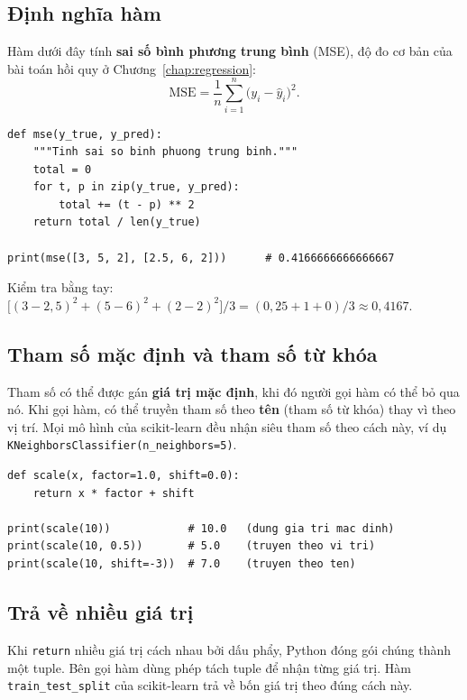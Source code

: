 \subsection{Định nghĩa hàm}
Hàm dưới đây tính \textbf{sai số bình phương trung bình} (MSE), độ đo cơ bản của bài toán hồi quy ở Chương~\ref{chap:regression}:
\begin{equation*}
    \mathrm{MSE} = \frac{1}{n}\sum_{i=1}^{n}\big(y_i - \hat{y}_i\big)^2 .
\end{equation*}

\begin{lstlisting}[caption={Định nghĩa hàm tính MSE}]
def mse(y_true, y_pred):
    """Tinh sai so binh phuong trung binh."""
    total = 0
    for t, p in zip(y_true, y_pred):
        total += (t - p) ** 2
    return total / len(y_true)

print(mse([3, 5, 2], [2.5, 6, 2]))      # 0.4166666666666667
\end{lstlisting}

\noindent Kiểm tra bằng tay: $\big[(3 - 2{,}5)^2 + (5 - 6)^2 + (2 - 2)^2\big] / 3 = (0{,}25 + 1 + 0)/3 \approx 0{,}4167$.

\subsection{Tham số mặc định và tham số từ khóa}
Tham số có thể được gán \textbf{giá trị mặc định}, khi đó người gọi hàm có thể bỏ qua nó. Khi gọi hàm, có thể truyền tham số theo \textbf{tên} (tham số từ khóa) thay vì theo vị trí. Mọi mô hình của scikit-learn đều nhận siêu tham số theo cách này, ví dụ \texttt{KNeighborsClassifier(n\_neighbors=5)}.

\begin{lstlisting}[caption={Tham số mặc định và tham số từ khóa}]
def scale(x, factor=1.0, shift=0.0):
    return x * factor + shift

print(scale(10))            # 10.0   (dung gia tri mac dinh)
print(scale(10, 0.5))       # 5.0    (truyen theo vi tri)
print(scale(10, shift=-3))  # 7.0    (truyen theo ten)
\end{lstlisting}

\subsection{Trả về nhiều giá trị}
Khi \texttt{return} nhiều giá trị cách nhau bởi dấu phẩy, Python đóng gói chúng thành một tuple. Bên gọi hàm dùng phép tách tuple để nhận từng giá trị. Hàm \texttt{train\_test\_split} của scikit-learn trả về bốn giá trị theo đúng cách này.


